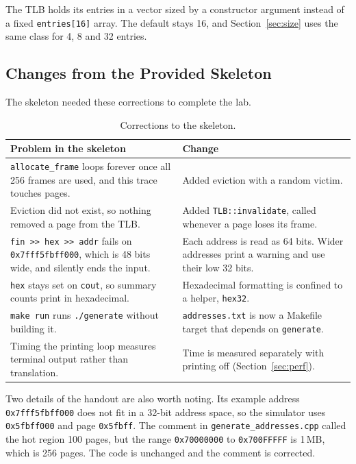 \documentclass[11pt]{article}
\newcommand{\code}[1]{\texttt{#1}}
\begin{document}
The TLB holds its entries in a vector sized by a constructor argument instead of
a fixed \code{entries[16]} array. The default stays 16, and Section~\ref{sec:size}
uses the same class for 4, 8 and 32 entries.

\subsection{Changes from the Provided Skeleton}

The skeleton needed these corrections to complete the lab.

\begin{table}[H]
\centering
\begin{tabularx}{\textwidth}{XX}
\toprule
\textbf{Problem in the skeleton} & \textbf{Change} \\
\midrule
\code{allocate\_frame} loops forever once all 256 frames are used, and this trace
touches \DistinctPages{} pages. & Added eviction with a random victim. \\
Eviction did not exist, so nothing removed a page from the TLB. &
Added \code{TLB::invalidate}, called whenever a page loses its frame. \\
\code{fin >{}> hex >{}> addr} fails on \code{0x7fff5fbff000}, which is 48 bits wide,
and silently ends the input. & Each address is read as 64 bits. Wider addresses
print a warning and use their low 32 bits. \\
\code{hex} stays set on \code{cout}, so summary counts print in hexadecimal. &
Hexadecimal formatting is confined to a helper, \code{hex32}. \\
\code{make run} runs \code{./generate} without building it. &
\code{addresses.txt} is now a Makefile target that depends on \code{generate}. \\
Timing the printing loop measures terminal output rather than translation. &
Time is measured separately with printing off (Section~\ref{sec:perf}). \\
\bottomrule
\end{tabularx}
\caption{Corrections to the skeleton.}
\end{table}

Two details of the handout are also worth noting. Its example address
\code{0x7fff5fbff000} does not fit in a 32-bit address space, so the simulator
uses \code{0x5fbff000} and page \code{0x5fbff}. The comment in
\code{generate\_addresses.cpp} called the hot region 100 pages, but the range
\code{0x70000000} to \code{0x700FFFFF} is 1\,MB, which is 256 pages. The code
is unchanged and the comment is corrected.
\end{document}
